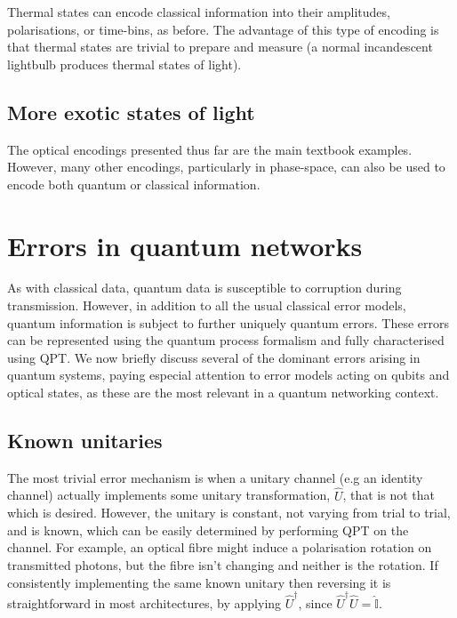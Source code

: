 \documentclass[aps,rmp,twocolumn,amsmath,amssymb,nofootinbib,superscriptaddress,longbibliography,floatfix]{revtex4-1}
\begin{document}
Thermal states can encode classical information into their amplitudes, polarisations, or time-bins, as before. The advantage of this type of encoding is that thermal states are trivial to prepare and measure (a normal incandescent lightbulb produces thermal states of light).

%
%

\subsection{More exotic states of light} \label{sec:exotic}

The optical encodings presented thus far are the main textbook examples. However, many other encodings, particularly in phase-space, can also be used to encode both quantum or classical information.

%
%

\section{Errors in quantum networks} \label{sec:errors_in_nets}

As with classical data, quantum data is susceptible to corruption during transmission. However, in addition to all the usual classical error models, quantum information is subject to further uniquely quantum errors. These errors can be represented using the quantum process formalism and fully characterised using QPT. We now briefly discuss several of the dominant errors arising in quantum systems, paying especial attention to error models acting on qubits and optical states, as these are the most relevant in a quantum networking context.

%
%

\subsection{Known unitaries}

The most trivial error mechanism is when a unitary channel (e.g an identity channel) actually implements some unitary transformation, $\hat{U}$, that is not that which is desired. However, the unitary is constant, not varying from trial to trial, and is known, which can be easily determined by performing QPT on the channel. For example, an optical fibre might induce a polarisation rotation on transmitted photons, but the fibre isn't changing and neither is the rotation. If consistently implementing the same known unitary then reversing it is straightforward in most architectures, by applying $\hat{U}^\dag$, since $\hat{U}^\dag\hat{U}=\hat{\mathbb{I}}$.
\end{document}
